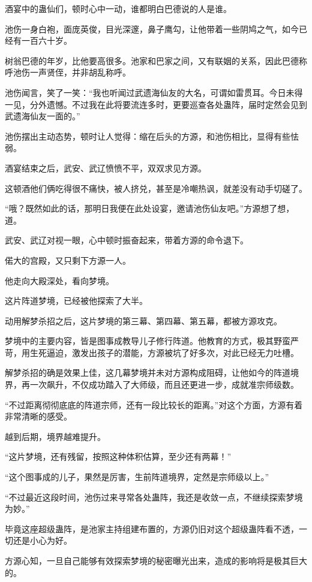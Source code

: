 \begin{this_body}
酒宴中的蛊仙们，顿时心中一动，谁都明白巴德说的人是谁。

池伤一身白袍，面庞英俊，目光深邃，鼻子鹰勾，让他带着一些阴鸠之气，如今已经有一百六十岁。

树翁巴德的年岁，比他要高很多。池家和巴家之间，又有联姻的关系，因此巴德称呼池伤一声贤侄，并非胡乱称呼。

池伤闻言，笑了一笑：“我也听闻过武遗海仙友的大名，可谓如雷贯耳。今日未得一见，分外遗憾。不过我在此将要流连多时，更要巡查各处蛊阵，届时定然会见到武遗海仙友一面的。”

池伤摆出主动态势，顿时让人觉得：缩在后头的方源，和池伤相比，显得有些怯弱。

酒宴结束之后，武安、武辽愤愤不平，双双求见方源。

这顿酒他们俩吃得很不痛快，被人挤兑，甚至是冷嘲热讽，就差没有动手切磋了。

“哦？既然如此的话，那明日我便在此处设宴，邀请池伤仙友吧。”方源想了想，道。

武安、武辽对视一眼，心中顿时振奋起来，带着方源的命令退下。

偌大的宫殿，又只剩下方源一人。

他走向大殿深处，看向梦境。

这片阵道梦境，已经被他探索了大半。

动用解梦杀招之后，这片梦境的第三幕、第四幕、第五幕，都被方源攻克。

梦境中的主要内容，皆是图事成教导儿子修行阵道。他教育的方式，极其野蛮严苛，用生死逼迫，激发出孩子的潜能，方源被坑了好多次，对此已经无力吐槽。

解梦杀招的确是效果上佳，这几幕梦境并未对方源构成阻碍，让他如今的阵道境界，再一次飙升，不仅成功踏入了大师级，而且还更进一步，成就准宗师级数。

“不过距离彻彻底底的阵道宗师，还有一段比较长的距离。”对这个方面，方源有着非常清晰的感受。

越到后期，境界越难提升。

“这片梦境，还有残留，按照这种体积估算，至少还有两幕！”

“这个图事成的儿子，果然是厉害，生前阵道境界，定然是宗师级以上。”

“不过最近这段时间，池伤过来寻常各处蛊阵，我还是收敛一点，不继续探索梦境为妙。”

毕竟这座超级蛊阵，是池家主持组建布置的，方源仍旧对这个超级蛊阵看不透，一切还是小心为好。

方源心知，一旦自己能够有效探索梦境的秘密曝光出来，造成的影响将是极其巨大的。


\end{this_body}
